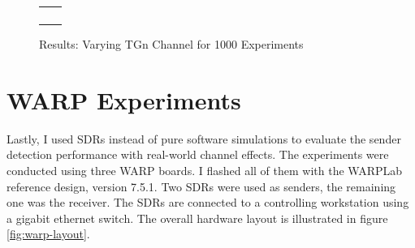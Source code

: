 \begin{figure}[p]
	\centering
	\setlength\figureheight{3cm}
	\setlength{}
	\begin{tabular}{cc}
		\subfloat[MCS 0]{} &
		\subfloat[MCS 1]{} \\
		\subfloat[MCS 2]{} &
		\subfloat[MCS 3]{} \\
		\subfloat[MCS 4]{} &
		\subfloat[MCS 5]{} \\
		\subfloat[MCS 6]{} &
		\subfloat[MCS 7]{} \\
	\end{tabular}
	\caption{Results: Varying TGn Channel for 1000 Experiments}
	\label{fig:vary_tgn}
\end{figure}



\section{WARP Experiments}\label{sec:ex-warp}

Lastly, I used \glspl{SDR} instead of pure software simulations to evaluate the sender detection performance with real-world channel effects. The experiments were conducted using three \gls{WARP} boards. I flashed all of them with the WARPLab reference design, version 7.5.1. Two \glspl{SDR} were used as senders, the remaining one was the receiver. The \glspl{SDR} are connected to a controlling workstation using a gigabit ethernet switch. The overall hardware layout is illustrated in figure \ref{fig:warp-layout}.

